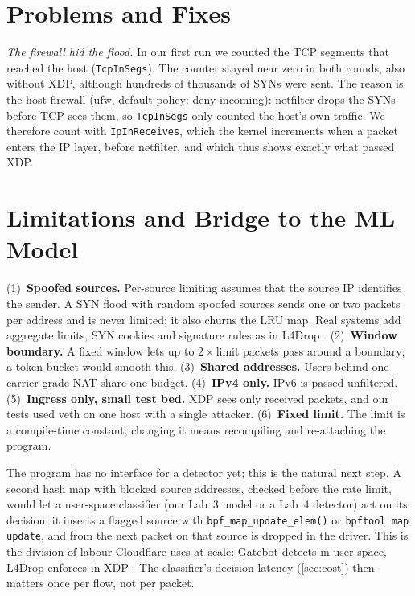 \section{Problems and Fixes}\label{sec:t4-problems}
\emph{The firewall hid the flood.} In our first run we counted the TCP segments that reached the host (\texttt{TcpInSegs}). The counter stayed near zero in both rounds, also without XDP, although hundreds of thousands of SYNs were sent. The reason is the host firewall (ufw, default policy: deny incoming): netfilter drops the SYNs before TCP sees them, so \texttt{TcpInSegs} only counted the host's own traffic. We therefore count with \texttt{IpInReceives}, which the kernel increments when a packet enters the IP layer, before netfilter, and which thus shows exactly what passed XDP.

\section{Limitations and Bridge to the ML Model}\label{sec:t4-limits}\label{sec:t4-bridge}
(1)~\textbf{Spoofed sources.} Per-source limiting assumes that the source IP identifies the sender. A SYN flood with random spoofed sources sends one or two packets per address and is never limited; it also churns the LRU map. Real systems add aggregate limits, SYN cookies and signature rules as in L4Drop \autocite{cf_l4drop}. (2)~\textbf{Window boundary.} A fixed window lets up to $2\times$limit packets pass around a boundary; a token bucket would smooth this. (3)~\textbf{Shared addresses.} Users behind one carrier-grade NAT share one budget. (4)~\textbf{IPv4 only.} IPv6 is passed unfiltered. (5)~\textbf{Ingress only, small test bed.} XDP sees only received packets, and our tests used veth on one host with a single attacker. (6)~\textbf{Fixed limit.} The limit is a compile-time constant; changing it means recompiling and re-attaching the program.

The program has no interface for a detector yet; this is the natural next step. A second hash map with blocked source addresses, checked before the rate limit, would let a user-space classifier (our Lab~3 model or a Lab~4 detector) act on its decision: it inserts a flagged source with \texttt{bpf\_map\_update\_elem()} or \texttt{bpftool map update}, and from the next packet on that source is dropped in the driver. This is the division of labour Cloudflare uses at scale: Gatebot detects in user space, L4Drop enforces in XDP \autocite{cf_gatebot,cf_l4drop}. The classifier's decision latency (\cref{sec:cost}) then matters once per flow, not per packet.
